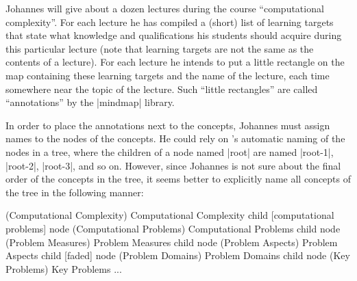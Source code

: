 Johannes will give about a dozen lectures during the course ``computational
complexity''. For each lecture he has compiled a (short) list of learning
targets that state what knowledge and qualifications his students should
acquire during this particular lecture (note that learning targets are not the
same as the contents of a lecture). For each lecture he intends to put a little
rectangle on the map containing these learning targets and the name of the
lecture, each time somewhere near the topic of the lecture. Such ``little
rectangles'' are called ``annotations'' by the |mindmap| library.

In order to place the annotations next to the concepts, Johannes must assign
names to the nodes of the concepts. He could rely on \tikzname's automatic
naming of the nodes in a tree, where the children of a node named |root| are
named |root-1|, |root-2|, |root-3|, and so on. However, since Johannes is not
sure about the final order of the concepts in the tree, it seems better to
explicitly name all concepts of the tree in the following manner:
%
\begin{codeexample}
 (Computational Complexity) {Computational Complexity}
  child [computational problems] { node (Computational Problems) {Computational Problems}
    child         { node (Problem Measures) {Problem Measures} }
    child         { node (Problem Aspects) {Problem Aspects} }
    child [faded] { node (Problem Domains) {Problem Domains} }
    child         { node (Key Problems) {Key Problems} }
  }
...
\end{codeexample}

